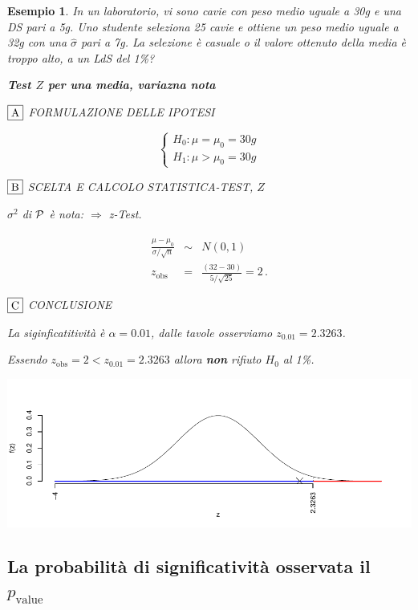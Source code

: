 \documentclass[
  11pt,
]{book}
\theoremstyle{mytheoremstyle}
\theoremstyle{mydefstyle}
\newtheorem{example}{{Esempio}}[section]
\begin{document}
\begin{example}

In un laboratorio, vi sono cavie con peso medio uguale a 30g e una DS
pari a 5g. Uno studente seleziona 25 cavie e ottiene un peso medio
uguale a 32g con una \(\hat\sigma\) pari a 7g. La selezione è casuale o il
valore ottenuto della media è troppo alto, a un LdS del 1\%?

\textbf{Test \(Z\) per una media, variazna nota}

\(\fbox{A}\) FORMULAZIONE DELLE IPOTESI

\[\begin{cases}
   H_0: \mu = \mu_0=30g \\
   H_1: \mu > \mu_0=30g 
   \end{cases}\]

\(\fbox{B}\) SCELTA E CALCOLO STATISTICA-TEST, \(Z\)

\(\sigma^{2}\) di \(\cal{P}\) è nota: \(\Rightarrow\) z-Test.

\begin{eqnarray*}
   \frac{\hat\mu - \mu_{0}} {\sigma/\sqrt{n}}&\sim&N(0,1)\\
   z_{\text{obs}}
   &=& \frac{ ( 32 -  30 )} { 5 /\sqrt{ 25 }}
   =   2 \, .
   \end{eqnarray*}

\(\fbox{C}\) CONCLUSIONE

La siginficatitività è \(\alpha=0.01\), dalle tavole osserviamo \(z_{0.01}=2.3263\).

Essendo \(z_\text{obs}=2<z_{0.01}=2.3263\) allora \textbf{non} rifiuto \(H_0\) al 1\%.

\begin{center}\includegraphics{Appunti_di_Statistica_2025_files/figure-latex/15-test-mu-pi-2,-1} \end{center}

\end{example}

\subsection{\texorpdfstring{La probabilità di significatività osservata il \(p_\text{value}\)}{La probabilità di significatività osservata il p\_\textbackslash text\{value\}}}\label{la-probabilituxe0-di-significativituxe0-osservata-il-p_textvalue}
\end{document}
